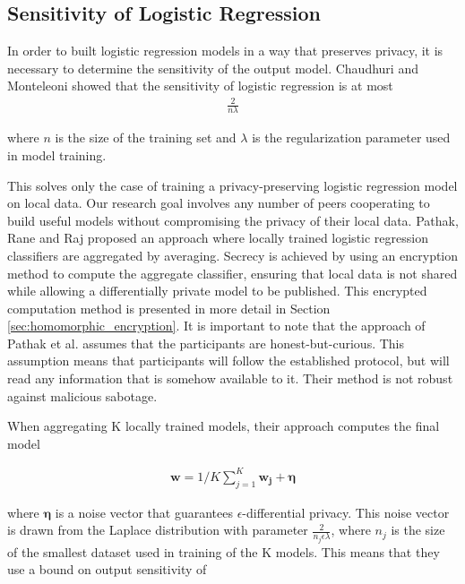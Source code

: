 \subsection{Sensitivity of Logistic Regression} \label{sec:Sensitivity_of_LogReg}

In order to built logistic regression models in a way that preserves privacy, it is necessary to determine the sensitivity of the output model. Chaudhuri and Monteleoni\cite{chaudhuri2009logistic} showed that the sensitivity of logistic regression is at most 
\begin{eqnarray}\label{eq:logres_sensitivity}
\frac{2}{n\lambda}
\end{eqnarray}

where $n$ is the size of the training set and $\lambda$ is the regularization parameter used in model training.

This solves only the case of training a privacy-preserving logistic regression model on local data. Our research goal involves any number of peers cooperating to build useful models without compromising the privacy of their local data. Pathak, Rane and Raj\cite{pathak2010diffprivhomo} proposed an approach where locally trained logistic regression classifiers are aggregated by averaging. Secrecy is achieved by using an encryption method to compute the aggregate classifier, ensuring that local data is not shared while allowing a differentially private model to be published. This encrypted computation method is presented in more detail in Section \ref{sec:homomorphic_encryption}. It is important to note that the approach of Pathak et al. assumes that the participants are honest-but-curious. This assumption means that participants will follow the established protocol, but will read any information that is somehow available to it. Their method is not robust against malicious sabotage. 

When aggregating K locally trained models, their approach computes the final model

\begin{eqnarray}
\boldsymbol{w} = 1/K\sum_{j=1}^{K} \boldsymbol{w_j} + \boldsymbol{\eta}
\end{eqnarray}


where $\boldsymbol{\eta}$ is a noise vector that guarantees $\epsilon$-differential privacy. This noise vector is drawn from the Laplace distribution with parameter $\frac{2}{n_j\epsilon\lambda}$, where $n_j$ is the size of the smallest dataset used in training of the K models. This means that they use a bound on output sensitivity of 

